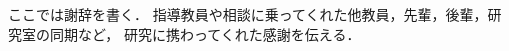 \begin{acknowledgment}
ここでは謝辞を書く．
指導教員や相談に乗ってくれた他教員，先輩，後輩，研究室の同期など，
研究に携わってくれた感謝を伝える．

\end{acknowledgment}
